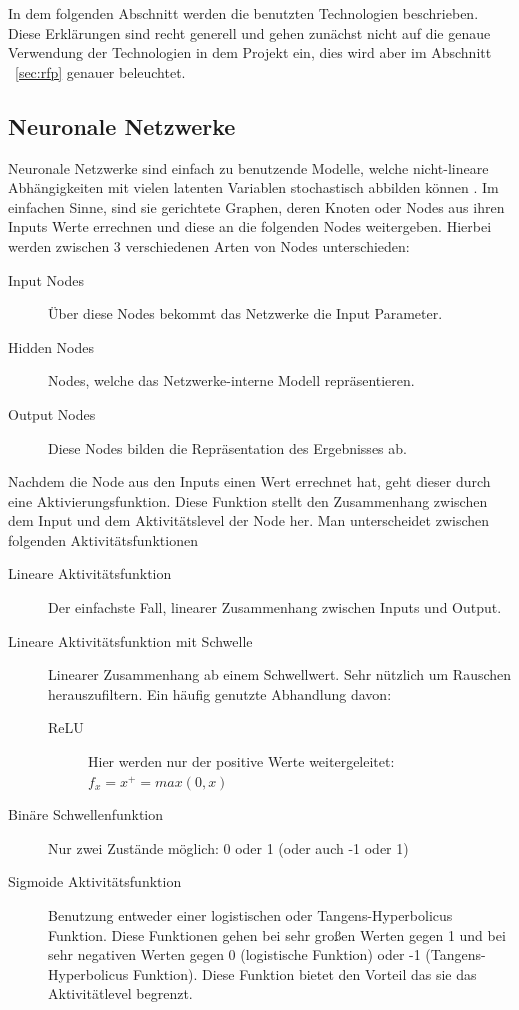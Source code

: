 \documentclass[pdftex,a4paper,halfparskip, article]{scrartcl}
\begin{document}
In dem folgenden Abschnitt werden die benutzten Technologien beschrieben. Diese Erklärungen sind recht generell und gehen zunächst nicht auf die genaue Verwendung der Technologien in dem Projekt ein, dies wird aber im Abschnitt ~\ref{sec:rfp} genauer beleuchtet.

\subsection{Neuronale Netzwerke}
Neuronale Netzwerke sind einfach zu benutzende Modelle, welche nicht-lineare Abhängigkeiten mit vielen latenten Variablen stochastisch abbilden können \cite{nnWebsite}. Im einfachen Sinne, sind sie gerichtete Graphen, deren Knoten oder Nodes aus ihren Inputs Werte errechnen und diese an die folgenden Nodes weitergeben. Hierbei werden zwischen 3 verschiedenen Arten von Nodes unterschieden:

\begin{description}
	\item[Input Nodes] Über diese Nodes bekommt das Netzwerke die Input Parameter.
	\item[Hidden Nodes] Nodes, welche das Netzwerke-interne Modell repräsentieren.
	\item[Output Nodes] Diese Nodes bilden die Repräsentation des Ergebnisses ab.
\end{description}

Nachdem die Node aus den Inputs einen Wert errechnet hat, geht dieser durch eine Aktivierungsfunktion. Diese Funktion stellt den Zusammenhang zwischen dem Input und dem Aktivitätslevel der Node her. Man unterscheidet zwischen folgenden Aktivitätsfunktionen

\begin{description}
	\item[Lineare Aktivitätsfunktion] Der einfachste Fall, linearer Zusammenhang zwischen Inputs und Output.
	\item[Lineare Aktivitätsfunktion mit Schwelle] Linearer Zusammenhang ab einem Schwellwert. Sehr nützlich um Rauschen herauszufiltern. Ein häufig genutzte Abhandlung davon:
	\begin{description}
		\item[ReLU] Hier werden nur der positive Werte weitergeleitet: \(f_x = x^+ = max(0,x) \)
	\end{description}
	\item[Binäre Schwellenfunktion] Nur zwei Zustände möglich: 0 oder 1 (oder auch -1 oder 1)
	\item[Sigmoide Aktivitätsfunktion] Benutzung entweder einer logistischen oder Tangens-Hyperbolicus Funktion. Diese Funktionen gehen bei sehr großen Werten gegen 1 und bei sehr negativen Werten gegen 0 (logistische Funktion) oder -1 (Tangens-Hyperbolicus Funktion). Diese Funktion bietet den Vorteil das sie das Aktivitätlevel begrenzt.
\end{description} 
\end{document}
